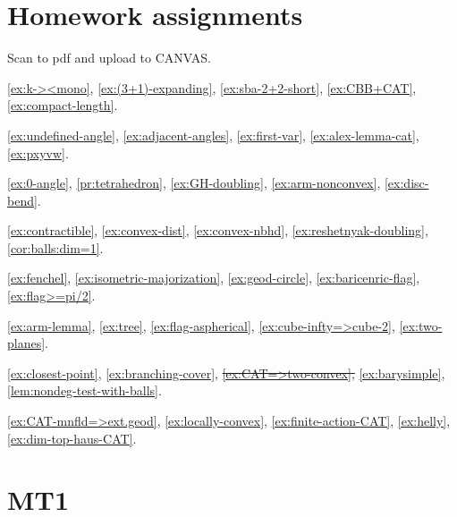 \chapter*{Homework assignments}

Scan to pdf and upload to CANVAS.

\ref{ex:k-><mono},
\ref{ex:(3+1)-expanding},
\ref{ex:sba-2+2-short},
\ref{ex:CBB+CAT},
\ref{ex:compact-length}.

\ref{ex:undefined-angle},
\ref{ex:adjacent-angles},
\ref{ex:first-var},
\ref{ex:alex-lemma-cat},
\ref{ex:pxyvw}.

\ref{ex:0-angle},
\ref{pr:tetrahedron},
\ref{ex:GH-doubling},
\ref{ex:arm-nonconvex},
\ref{ex:disc-bend}.

\ref{ex:contractible},
\ref{ex:convex-dist},
\ref{ex:convex-nbhd},
\ref{ex:reshetnyak-doubling},
\ref{cor:balls:dim=1}.

\ref{ex:fenchel},
\ref{ex:isometric-majorization},
\ref{ex:geod-circle},
\ref{ex:baricenric-flag},
\ref{ex:flag>=pi/2}.

\ref{ex:arm-lemma},
\ref{ex:tree},
\ref{ex:flag-aspherical},
\ref{ex:cube-infty=>cube-2},
\ref{ex:two-planes}.

\ref{ex:closest-point},
\ref{ex:branching-cover},
\sout{\ref{ex:CAT=>two-convex},}
\ref{ex:barysimple},
\ref{lem:nondeg-test-with-balls}.

\ref{ex:CAT-mnfld=>ext.geod},
\ref{ex:locally-convex},
\ref{ex:finite-action-CAT},
\ref{ex:helly},
\ref{ex:dim-top-haus-CAT}.


\newpage

\chapter*{MT1}

